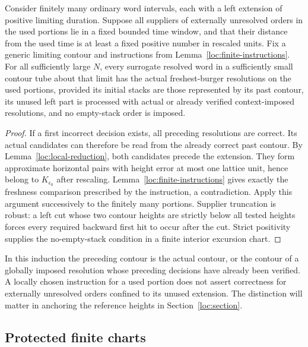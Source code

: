 \begin{lemma}\label{loc:first-error}
Consider finitely many ordinary word intervals, each with a left extension
of positive limiting duration.  Suppose all suppliers of externally
unresolved orders in the used portions lie in a fixed bounded time window,
and that their distance from the used time is at least a fixed positive
number in rescaled units.  Fix a generic limiting contour and instructions
from Lemma~\ref{loc:finite-instructions}.  For all sufficiently large
$N$, every surrogate resolved word in a sufficiently small contour tube
about that limit has the actual freshest-burger resolutions on the used
portions, provided its initial stacks are those represented by its past
contour, its unused left part is processed with actual or already
verified context-imposed resolutions, and no empty-stack order is imposed.
\end{lemma}
\begin{proof}
If a first incorrect decision exists, all preceding resolutions are
correct.  Its actual candidates can therefore be read from the already
correct past contour.  By Lemma~\ref{loc:local-reduction}, both candidates
precede the extension.  They form approximate horizontal pairs with height
error at most one lattice unit, hence belong to $K_{\epsilon_0}$ after
rescaling.  Lemma~\ref{loc:finite-instructions} gives exactly the
freshness comparison prescribed by the instruction, a contradiction.
Apply this argument successively to the finitely many portions.  Supplier
truncation is robust: a left cut whose two contour heights are strictly
below all tested heights forces every required backward first hit to occur
after the cut.  Strict positivity supplies the no-empty-stack condition
in a finite interior excursion chart.
\end{proof}

In this induction the preceding contour is the actual contour, or the
contour of a globally imposed resolution whose preceding decisions have
already been verified.  A locally chosen instruction for a used portion
does not assert correctness for externally unresolved orders confined to
its unused extension.  The distinction will matter in anchoring the
reference heights in Section~\ref{loc:section}.

\subsection{Protected finite charts}

